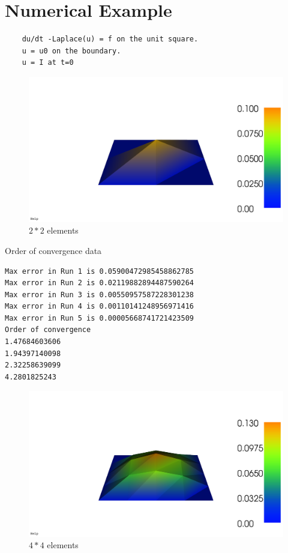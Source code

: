 \section{Numerical Example}
\begin{lstlisting}
	du/dt -Laplace(u) = f on the unit square.
	u = u0 on the boundary.
	u = I at t=0
\end{lstlisting}
\begin{figure}[h]
	\center
	\includegraphics[scale = 0.25]{images/4.png}
	\caption{$2 * 2$ elements}
\end{figure}
Order of convergence data
\begin{lstlisting}
Max error in Run 1 is 0.05900472985458862785
Max error in Run 2 is 0.02119882894487590264
Max error in Run 3 is 0.00550957587228301238
Max error in Run 4 is 0.00110141248956971416
Max error in Run 5 is 0.00005668741721423509
Order of convergence
1.47684603606
1.94397140098
2.32258639099
4.2801825243
\end{lstlisting}
\begin{figure}[h]
	\center
	\includegraphics[scale = 0.25]{images/16.png}
	\caption{$4 * 4$ elements}
\end{figure}
